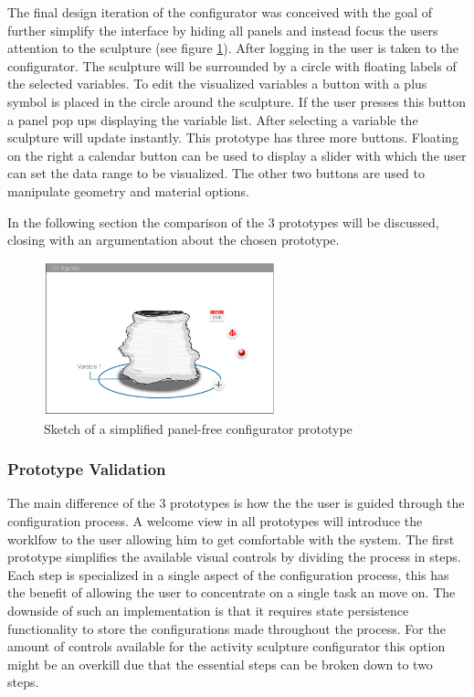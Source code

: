 \documentclass[../medieninformatik-arbeit.tex]{subfiles}
\begin{document}
The final design iteration of the configurator was conceived with the goal of further simplify the interface by hiding all panels and instead focus the users attention to the sculpture (see figure \ref{fig:uiproto3}). After logging in the user is taken to the configurator. The sculpture will be surrounded by a circle with floating labels of the selected variables. To edit the visualized variables a button with a plus symbol is placed in the circle around the sculpture. If the user presses this button a panel pop ups displaying the variable list. After selecting a variable the sculpture will update instantly. This prototype has three more buttons. Floating on the right a calendar button can be used to display a slider with which the user can set the data range to be visualized. The other two buttons are used to manipulate geometry and material options. 

In the following section the comparison of the 3 prototypes will be discussed, closing with an argumentation about the chosen prototype. 

\begin{figure}[h]
\captionsetup{width=0.9\textwidth}
\begin{center}
  \includegraphics[width=0.6\textwidth]{Prototype/img/ui_proto3}
  \caption{Sketch of a simplified panel-free configurator prototype}
\label{fig:uiproto3}
\end{center}
\end{figure}

\subsubsection{Prototype Validation}
The main difference of the 3 prototypes is how the the user is guided through the configuration process. A welcome view in all prototypes will introduce the worklfow to the user allowing him to get comfortable with the system. The first prototype simplifies the available visual controls by dividing the process in steps. Each step is specialized in a single aspect of the configuration process, this has the benefit of allowing the user to concentrate on a single task an move on. The downside of such an implementation is that it requires state persistence functionality to store the configurations made throughout the process. For the amount of controls available for the activity sculpture configurator this option might be an overkill due that the essential steps can be broken down to two steps. 
\end{document}
